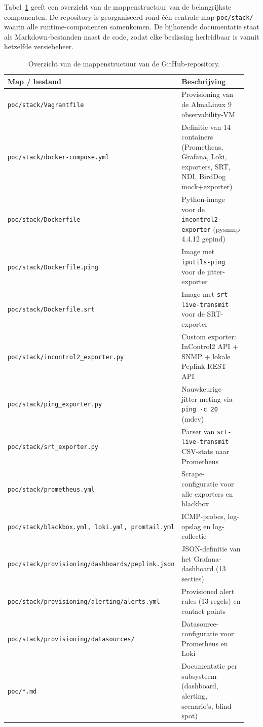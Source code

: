 Tabel~\ref{tab:repo-structuur} geeft een overzicht van de mappenstructuur van de belangrijkste componenten. De repository is georganiseerd rond één centrale map \texttt{poc/stack/} waarin alle runtime-componenten samenkomen. De bijhorende documentatie staat als Markdown-bestanden naast de code, zodat elke beslissing herleidbaar is vanuit hetzelfde versiebeheer.

\begin{table}[H]
  \centering
  \caption[Structuur van de PoC-repository]{Overzicht van de mappenstructuur van de GitHub-repository.}
  \label{tab:repo-structuur}
  \begin{tabular}{p{0.42\linewidth} p{0.52\linewidth}}
    \hline
    \textbf{Map / bestand} & \textbf{Beschrijving} \\
    \hline
    \texttt{poc/stack/Vagrantfile}                 & Provisioning van de AlmaLinux 9 observability-VM \\
    \texttt{poc/stack/docker-compose.yml}          & Definitie van 14 containers (Prometheus, Grafana, Loki, exporters, SRT, NDI, BirdDog mock+exporter) \\
    \texttt{poc/stack/Dockerfile}                  & Python-image voor de \texttt{incontrol2-exporter} (pysnmp 4.4.12 gepind) \\
    \texttt{poc/stack/Dockerfile.ping}             & Image met \texttt{iputils-ping} voor de jitter-exporter \\
    \texttt{poc/stack/Dockerfile.srt}              & Image met \texttt{srt-live-transmit} voor de SRT-exporter \\
    \texttt{poc/stack/incontrol2\_exporter.py}     & Custom exporter: InControl2 API + SNMP + lokale Peplink REST API \\
    \texttt{poc/stack/ping\_exporter.py}           & Nauwkeurige jitter-meting via \texttt{ping -c 20} (mdev) \\
    \texttt{poc/stack/srt\_exporter.py}            & Parser van \texttt{srt-live-transmit} CSV-stats naar Prometheus \\
    \texttt{poc/stack/prometheus.yml}              & Scrape-configuratie voor alle exporters en blackbox \\
    \texttt{poc/stack/blackbox.yml, loki.yml, promtail.yml} & ICMP-probes, log-opslag en log-collectie \\
    \texttt{poc/stack/provisioning/dashboards/peplink.json} & JSON-definitie van het Grafana-dashboard (13 secties) \\
    \texttt{poc/stack/provisioning/alerting/alerts.yml}      & Provisioned alert rules (13 regels) en contact points \\
    \texttt{poc/stack/provisioning/datasources/}             & Datasource-configuratie voor Prometheus en Loki \\
    \texttt{poc/*.md}                              & Documentatie per subsysteem (dashboard, alerting, scenario's, blind-spot) \\
    \hline
  \end{tabular}
\end{table}

